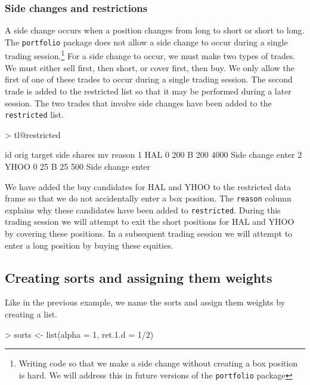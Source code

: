 \documentclass{article}
\begin{document}
\subsubsection{Side changes and restrictions}

A side change occurs when a position changes from long to short or
short to long.  The \texttt{portfolio} package does not allow a side
change to occur during a single trading session.\footnote{Writing code
so that we make a side change without creating a box position is hard.
We will address this in future versions of the \texttt{portfolio}
package} For a side change to occur, we must make two types of trades.
We must either sell first, then short, or cover first, then buy.  We
only allow the first of one of these trades to occur during a single
trading session.  The second trade is added to the restricted list so
that it may be performed during a later session.  The two trades that
involve side changes have been added to the \texttt{restricted} list.


\begin{Schunk}
\begin{Sinput}
> tl@restricted
\end{Sinput}
\begin{Soutput}
    id orig target side shares   mv            reason
1  HAL    0    200    B    200 4000 Side change enter
2 YHOO    0     25    B     25  500 Side change enter
\end{Soutput}
\end{Schunk}

We have added the buy candidates for HAL and YHOO to the restricted
data frame so that we do not accidentally enter a box position.  The
\texttt{reason} column explains why these candidates have been added
to \texttt{restricted}.  During this trading session we will attempt
to exit the short positions for HAL and YHOO by covering these
positions.  In a subsequent trading session we will attempt to enter a
long position by buying these equities.

\subsection{Creating sorts and assigning them weights}

Like in the previous example, we name the sorts and assign them
weights by creating a list.

\begin{Schunk}
\begin{Sinput}
> sorts <- list(alpha = 1, ret.1.d = 1/2)
\end{Sinput}
\end{Schunk}
\end{document}
